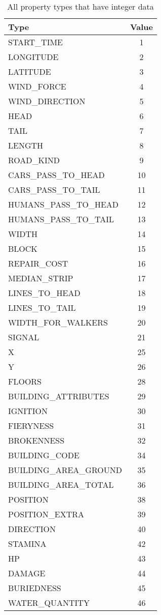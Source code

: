 \begin{table}[pht]
\center
\begin{tabular}{|lc|}
\hline
Type & Value\\
\hline
START\_TIME & 1 \\
LONGITUDE & 2 \\
LATITUDE & 3 \\
WIND\_FORCE & 4 \\
WIND\_DIRECTION & 5 \\

HEAD & 6 \\
TAIL & 7 \\
LENGTH & 8 \\

ROAD\_KIND & 9 \\
CARS\_PASS\_TO\_HEAD & 10 \\
CARS\_PASS\_TO\_TAIL & 11 \\
HUMANS\_PASS\_TO\_HEAD & 12 \\
HUMANS\_PASS\_TO\_TAIL & 13 \\
WIDTH & 14 \\
BLOCK & 15 \\
REPAIR\_COST & 16 \\
MEDIAN\_STRIP & 17 \\
LINES\_TO\_HEAD & 18 \\
LINES\_TO\_TAIL & 19 \\
WIDTH\_FOR\_WALKERS & 20 \\
SIGNAL & 21 \\

X & 25 \\
Y & 26 \\

FLOORS & 28 \\
BUILDING\_ATTRIBUTES & 29 \\
IGNITION & 30 \\
FIERYNESS & 31 \\
BROKENNESS & 32 \\
BUILDING\_CODE & 34 \\
BUILDING\_AREA\_GROUND & 35 \\
BUILDING\_AREA\_TOTAL & 36 \\

POSITION & 38 \\
POSITION\_EXTRA & 39 \\
DIRECTION & 40 \\
STAMINA & 42 \\
HP & 43 \\
DAMAGE & 44 \\
BURIEDNESS & 45 \\
WATER\_QUANTITY & 46 \\
\hline
\end{tabular}
\caption{All property types that have integer data}
\label{table_int_property_types}
\end{table}

